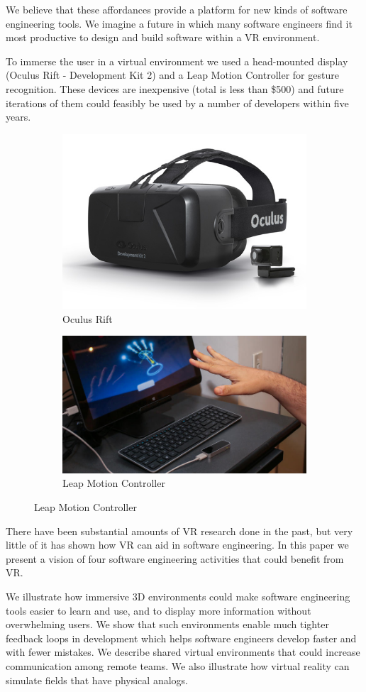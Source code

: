 \documentclass[conference]{IEEEtran}
\begin{document}
We believe that these affordances provide a platform for new kinds of software engineering tools. 
We imagine a future in which many software engineers find it most productive to design and build software within a VR environment. 

To immerse the user in a virtual environment we used a head-mounted display (Oculus Rift - Development Kit 2) and a Leap Motion Controller for gesture recognition. 
These devices are inexpensive (total is less than \$500) and future iterations of them could feasibly be used by a number of developers within five years.

\begin{figure}[ht!]
\centering
\begin{subfigure}{.5\columnwidth}
	\centering
	\includegraphics[width=.4\linewidth]{figures/dk2}
	\caption{Oculus Rift\label{fig:rift}}
\end{subfigure}%
\begin{subfigure}{.5\columnwidth}
  \centering
  \includegraphics[width=.4\linewidth]{figures/LeapAndKeyboard}
  \caption{Leap Motion Controller \label{fig:leap}}
\end{subfigure}
\end{figure}

There have been substantial amounts of VR research done in the past, but very little of it has shown how VR can aid in software engineering. 
In this paper we present a vision of four software engineering activities that could benefit from VR.

We illustrate how immersive 3D environments could make software engineering tools easier to learn and use, and to display more information without overwhelming users. 
We show that such environments enable much tighter feedback loops in development which helps software engineers develop faster and with fewer mistakes. 
We describe shared virtual environments that could increase communication among remote teams. 
We also illustrate how virtual reality can simulate fields that have physical analogs.
\end{document}
